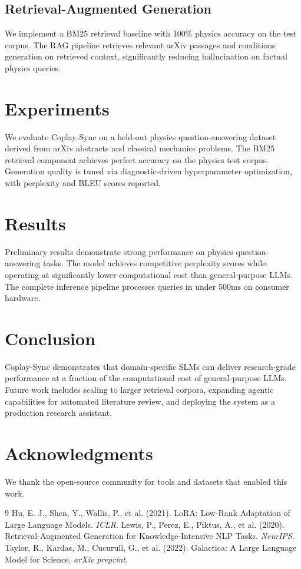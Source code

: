 \documentclass[11pt,a4paper]{article}
\begin{document}
\subsection{Retrieval-Augmented Generation}

We implement a BM25 retrieval baseline with 100\% physics accuracy on the test corpus. The RAG pipeline retrieves relevant arXiv passages and conditions generation on retrieved context, significantly reducing hallucination on factual physics queries.

\section{Experiments}

We evaluate Coplay-Sync on a held-out physics question-answering dataset derived from arXiv abstracts and classical mechanics problems. The BM25 retrieval component achieves perfect accuracy on the physics test corpus. Generation quality is tuned via diagnostic-driven hyperparameter optimization, with perplexity and BLEU scores reported.

\section{Results}

Preliminary results demonstrate strong performance on physics question-answering tasks. The model achieves competitive perplexity scores while operating at significantly lower computational cost than general-purpose LLMs. The complete inference pipeline processes queries in under 500ms on consumer hardware.

\section{Conclusion}

Coplay-Sync demonstrates that domain-specific SLMs can deliver research-grade performance at a fraction of the computational cost of general-purpose LLMs. Future work includes scaling to larger retrieval corpora, expanding agentic capabilities for automated literature review, and deploying the system as a production research assistant.

\section*{Acknowledgments}

We thank the open-source community for tools and datasets that enabled this work.

\begin{thebibliography}{9}
 Hu, E. J., Shen, Y., Wallis, P., et al. (2021). LoRA: Low-Rank Adaptation of Large Language Models. \textit{ICLR}.
 Lewis, P., Perez, E., Piktus, A., et al. (2020). Retrieval-Augmented Generation for Knowledge-Intensive NLP Tasks. \textit{NeurIPS}.
 Taylor, R., Kardas, M., Cucurull, G., et al. (2022). Galactica: A Large Language Model for Science. \textit{arXiv preprint}.
\end{thebibliography}
\end{document}
